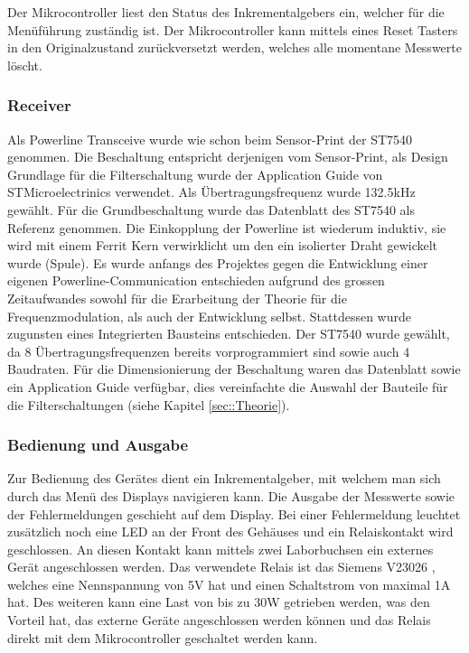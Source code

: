 Der Mikrocontroller liest den Status des Inkrementalgebers ein, welcher für die Menüführung zuständig ist. Der Mikrocontroller kann mittels eines Reset Tasters in den Originalzustand zurückversetzt werden, welches alle momentane Messwerte löscht.

\subsubsection{Receiver}
Als Powerline Transceive wurde wie schon beim Sensor-Print der ST7540 genommen. Die Beschaltung entspricht derjenigen vom Sensor-Print, als Design Grundlage für die Filterschaltung wurde der Application Guide \cite[p. 48]{Applic_Guide_ST7540} von STMicroelectrinics verwendet. Als Übertragungsfrequenz wurde 132.5kHz gewählt. Für die Grundbeschaltung wurde das Datenblatt des ST7540 \cite[p. 40]{Datasheet_ST7540} als Referenz genommen. Die Einkopplung der Powerline ist wiederum induktiv, sie wird mit einem Ferrit Kern verwirklicht um den ein isolierter Draht gewickelt wurde (Spule).
Es wurde anfangs des Projektes gegen die Entwicklung einer eigenen Powerline-Communication entschieden aufgrund des grossen Zeitaufwandes sowohl für die Erarbeitung der Theorie für die Frequenzmodulation, als auch der Entwicklung selbst. Stattdessen wurde zugunsten eines Integrierten Bausteins entschieden. Der ST7540 wurde gewählt, da 8 Übertragungsfrequenzen bereits vorprogrammiert sind sowie auch 4 Baudraten. Für die Dimensionierung der Beschaltung waren das Datenblatt \cite{Datasheet_ST7540} sowie ein Application Guide \cite{Applic_Guide_ST7540} verfügbar, dies vereinfachte die Auswahl der Bauteile für die Filterschaltungen (siehe Kapitel \ref{sec::Theorie}).

\subsubsection{Bedienung und Ausgabe}
Zur Bedienung des Gerätes dient ein Inkrementalgeber, mit welchem man sich durch das Menü des Displays navigieren kann. Die Ausgabe der Messwerte sowie der Fehlermeldungen geschieht auf dem Display. Bei einer Fehlermeldung leuchtet zusätzlich noch eine LED an der Front des Gehäuses und ein Relaiskontakt wird geschlossen. An diesen Kontakt kann mittels zwei Laborbuchsen ein externes Gerät angeschlossen werden. Das verwendete Relais ist das Siemens V23026 \cite{Siemens_Rel}, welches eine Nennspannung von 5V hat und einen Schaltstrom von maximal 1A hat. Des weiteren kann eine Last von bis zu 30W getrieben werden, was den Vorteil hat, das externe Geräte angeschlossen werden können und das Relais direkt mit dem Mikrocontroller geschaltet werden kann.

